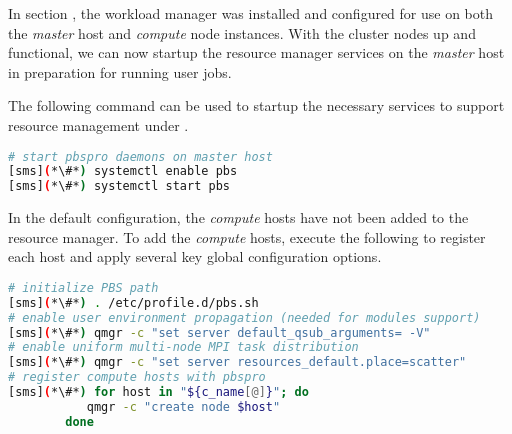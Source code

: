 
In section , the \rms{} workload manager was installed
and configured for use on both the {\em master} host and {\em compute} node
instances. With the cluster nodes up and functional, we can now startup the
resource manager services on the {\em master} host in preparation for running 
user jobs.

The following command can be used to startup the necessary services to support
resource management under \rms{}.

\begin{lstlisting}[language=bash,keywords={}]
# start pbspro daemons on master host
[sms](*\#*) systemctl enable pbs
[sms](*\#*) systemctl start pbs
\end{lstlisting}

In the default configuration, the {\em compute} hosts have not been added to
the \rms{} resource manager. To add the {\em compute} hosts, execute the
following to register each host and apply several key global configuration
options.

\begin{lstlisting}[language=bash,keywords={}]
# initialize PBS path
[sms](*\#*) . /etc/profile.d/pbs.sh
# enable user environment propagation (needed for modules support)
[sms](*\#*) qmgr -c "set server default_qsub_arguments= -V"
# enable uniform multi-node MPI task distribution
[sms](*\#*) qmgr -c "set server resources_default.place=scatter"
# register compute hosts with pbspro
[sms](*\#*) for host in "${c_name[@]}"; do
           qmgr -c "create node $host"
        done
\end{lstlisting}

